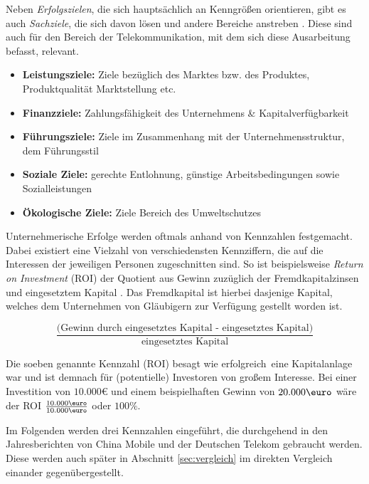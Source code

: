\documentclass[12pt, a4paper]{article}
\begin{document}
Neben \textit{Erfolgszielen}, die sich hauptsächlich an Kenngrößen orientieren, gibt es auch \textit{Sachziele}, die sich davon lösen und andere Bereiche anstreben \cite{domschke}. Diese sind auch für den Bereich der Telekommunikation, mit dem sich diese Ausarbeitung befasst, relevant.

\label{unternehmensziele}
\begin{itemize}
\item \textbf{Leistungsziele:} Ziele bezüglich des Marktes bzw. des Produktes, Produktqualität Marktstellung etc.
\item \textbf{Finanzziele:} Zahlungsfähigkeit des Unternehmens \& Kapitalverfügbarkeit
\item \textbf{Führungsziele:} Ziele im Zusammenhang mit der Unternehmensstruktur, dem Führungsstil 
\item \textbf{Soziale Ziele:} gerechte Entlohnung, günstige Arbeitsbedingungen sowie Sozialleistungen
\item \textbf{Ökologische Ziele:} Ziele Bereich des Umweltschutzes
\end{itemize}

Unternehmerische Erfolge werden oftmals anhand von Kennzahlen festgemacht. Dabei existiert eine Vielzahl von verschiedensten Kennziffern, die auf die Interessen der jeweiligen Personen zugeschnitten sind. So ist beispielsweise \textit{Return on Investment} (ROI) der Quotient aus Gewinn zuzüglich der Fremdkapitalzinsen und eingesetztem Kapital \cite{domschke}. Das Fremdkapital ist hierbei dasjenige Kapital, welches dem Unternehmen von Gläubigern zur Verfügung gestellt worden ist.

\begin{equation}
\frac{\text{(Gewinn durch eingesetztes Kapital - eingesetztes Kapital)}}{\text{eingesetztes Kapital}}
\end{equation}

Die soeben genannte Kennzahl (ROI) besagt wie \glqq erfolgreich\grqq \ eine Kapitalanlage war und ist demnach für (potentielle) Investoren von großem Interesse. Bei einer Investition von $10.000\euro$ und einem beispielhaften Gewinn von $20.000\text{\euro}$ wäre der ROI $\frac{10.000\text{\euro}}{10.000\text{\euro}}$ oder $100\%$. 

Im Folgenden werden drei Kennzahlen eingeführt, die durchgehend in den Jahresberichten von China Mobile und der Deutschen Telekom gebraucht werden. Diese werden auch später in Abschnitt \ref{sec:vergleich} im direkten Vergleich einander gegenübergestellt.
\end{document}
